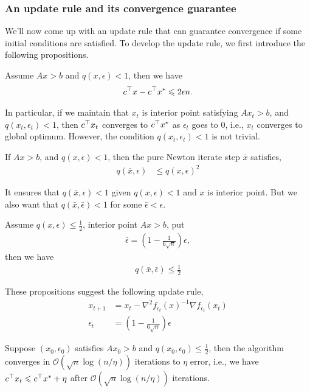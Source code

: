 \subsubsection{An update rule and its convergence guarantee}
We'll now come up with an update rule that can guarantee convergence if some initial conditions are satisfied. To develop the update rule, we first introduce the following propositions. 
\begin{proposition}\label{prop1}
Assume $Ax > b$ and $q(x, \epsilon)<1$, then we have
\begin{align}
c^\top x-c^\top x^{*}\leqslant 2\epsilon n.
\end{align}
\end{proposition}
In particular, if we maintain that $x_t$ is interior point satisfying $Ax_t>b$,
and $q(x_t, \epsilon_t) < 1$, then $c^\top x_t$ converges to $c^\top x^*$ as $\epsilon_t$ goes to $0$, i.e., $x_t$ converges to global optimum. However, the condition $q(x_t,\epsilon_t)<1$ is not trivial.  

\begin{proposition}\label{prop2}
If $Ax>b$, and $q(x,\epsilon)<1$, then the pure Newton iterate
step $\bar{x}$ satisfies,
\begin{align}
q(\bar{x}, \epsilon) &\leq q(x, \epsilon)^2 
\end{align}
\end{proposition}
It ensures that $q(\bar{x}, {\epsilon})<1$ given $q(x,\epsilon)<1$ and $x$ is interior point. But we also want that $q(\bar{x}, \bar{\epsilon})<1$ for some $\bar{\epsilon}<\epsilon$. 

\begin{proposition}\label{prop3}
Assume $q(x,\epsilon)\leq \frac{1}{2}$, interior point $Ax>b$,
put 
\begin{align}
\bar{\epsilon} = \left(1-\frac{1}{6\sqrt{n}}\right)\epsilon,
\end{align}
then we have
\begin{align}
q(\bar{x}, \bar{\epsilon})\leq \frac{1}{2}
\end{align}
\end{proposition}
These propositions suggest the following update rule,
\begin{align}
x_{t+1} & = x_t - \nabla^2 f_{\epsilon_t}(x)^{-1}\nabla f_{\epsilon_t}(x_t) \\
\epsilon_t & = \left(1-\frac{1}{6\sqrt{n}}\right)\epsilon
\end{align}
\begin{theorem}
Suppose $(x_0, \epsilon_0)$ satisfies $Ax_0 >b$ and 
$q(x_0,\epsilon_0)\leq\frac{1}{2}$, then the algorithm
converges in $\mathcal{O}(\sqrt{n}\log(n/\eta))$ iterations to $\eta$ error, i.e., we have $c^\top x_t\leqslant{c^\top x^*+\eta}$ after $\mathcal{O}(\sqrt{n}\log(n/\eta))$ iterations.
\end{theorem}

